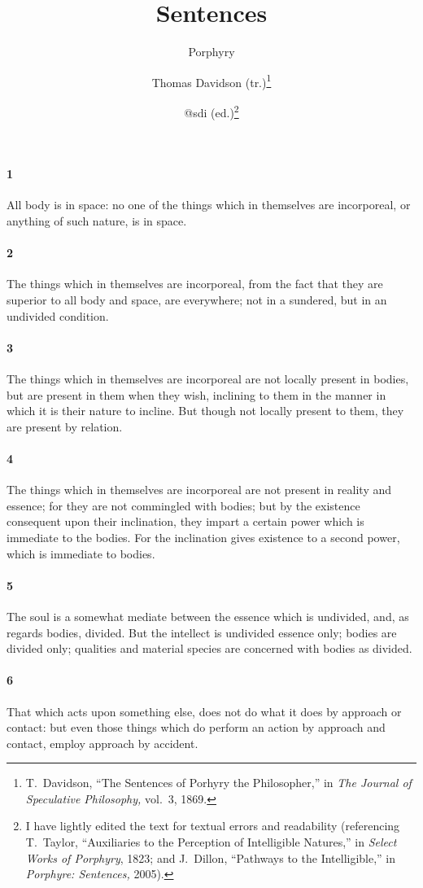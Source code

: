 \documentclass[12pt]{article}
\title{\Huge\swshape Sentences}
\author{Porphyry \and Thomas Davidson (tr.)\footnote{T.~Davidson, ``The
Sentences of Porhyry the Philosopher,'' in \textit{The Journal of Speculative
Philosophy,} vol.~3, 1869.} \and @sdi (ed.)\footnote{I have lightly edited the
text for textual errors and readability (referencing T.~Taylor, ``Auxiliaries
to the Perception of Intelligible Natures,'' in \textit{Select Works of
Porphyry}, 1823; and J.~Dillon, ``Pathways to the Intelligible,'' in
\textit{Porphyre: Sentences,} 2005).}}
\date{}
\begin{document}
\maketitle

\paragraph{1} All body is in space: no one of the things which in themselves
are incorporeal, or anything of such nature, is in space.

\paragraph{2} The things which in themselves are incorporeal, from the fact
that they are superior to all body and space, are everywhere; not in a
sundered, but in an undivided condition.

\paragraph{3} The things which in themselves are incorporeal are not locally
present in bodies, but are present in them when they wish, inclining to them in
the manner in which it is their nature to incline. But though not locally
present to them, they are present by relation.

\paragraph{4} The things which in themselves are incorporeal are not present in
reality and es\-sence; for they are not commingled with bodies; but by the
existence consequent upon their inclination, they impart a certain power which
is immediate to the bodies. For the inclination gives existence to a second
power, which is immediate to bodies.

\paragraph{5} The soul is a somewhat mediate between the es\-sence which is
undivided, and, as regards bodies, divided. But the intellect is undivided
es\-sence only; bodies are divided only; qualities and material species are
concerned with bodies as divided.

\paragraph{6} That which acts upon something else, does not do what it does by
approach or contact: but even those things which do perform an action by
approach and contact, employ approach by accident.
\end{document}
